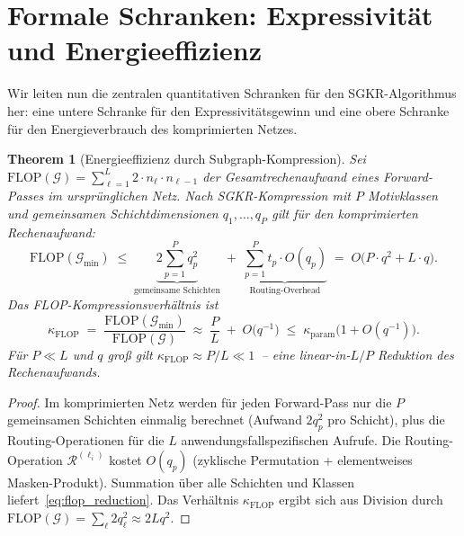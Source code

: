 ﻿\documentclass[12pt, a4paper, openany]{report}
\newtheorem{theorem}{Theorem}[chapter]
\newcommand{\calG}{\mathcal{G}}
\newcommand{\calR}{\mathcal{R}}
\begin{document}
\section{Formale Schranken: Expressivität und Energieeffizienz}
\label{sec:sgkr_bounds}

Wir leiten nun die zentralen quantitativen Schranken für den
SGKR-Algorithmus her: eine untere Schranke für den Expressivitätsgewinn
und eine obere Schranke für den Energieverbrauch des komprimierten Netzes.

\begin{theorem}[Energieeffizienz durch Subgraph-Kompression]
\label{thm:energy_efficiency}
Sei $\mathrm{FLOP}(\calG) = \sum_{\ell=1}^L 2 \cdot n_\ell \cdot n_{\ell-1}$
der Gesamtrechenaufwand eines Forward-Passes im ursprünglichen Netz.  Nach
SGKR-Kompression mit $P$ Motivklassen und gemeinsamen Schichtdimensionen
$q_1, \ldots, q_P$ gilt für den komprimierten Rechenaufwand:
\begin{equation}
  \label{eq:flop_reduction}
  \mathrm{FLOP}(\calG_{\min})
  \;\leq\;
  \underbrace{
    2\sum_{p=1}^{P} q_p^2
  }_{\text{gemeinsame Schichten}}
  \;+\;
  \underbrace{
    \sum_{p=1}^{P} t_p \cdot O(q_p)
  }_{\text{Routing-Overhead}}
  \;=\;
  O\!\bigl(P \cdot q^2 + L \cdot q\bigr).
\end{equation}
Das \emph{FLOP-Kompressionsverhältnis} ist
\begin{equation}
  \label{eq:flop_ratio}
  \kappa_{\mathrm{FLOP}}
  \;=\;
  \frac{\mathrm{FLOP}(\calG_{\min})}{\mathrm{FLOP}(\calG)}
  \;\approx\;
  \frac{P}{L} \;+\; O\!\bigl(q^{-1}\bigr)
  \;\leq\; \kappa_{\mathrm{param}}\bigl(1 + O(q^{-1})\bigr).
\end{equation}
Für $P \ll L$ und $q$ groß gilt $\kappa_{\mathrm{FLOP}} \approx P/L \ll 1$~--
eine linear-in-$L/P$ Reduktion des Rechenaufwands.
\end{theorem}

\begin{proof}
Im komprimierten Netz werden für jeden Forward-Pass nur die $P$ gemeinsamen
Schichten einmalig berechnet (Aufwand $2q_p^2$ pro Schicht), plus die
Routing-Operationen für die $L$ anwendungsfallspezifischen Aufrufe.
Die Routing-Operation $\calR^{(\ell_i)}$ kostet $O(q_p)$ (zyklische
Permutation + elementweises Masken-Produkt).  Summation über alle
Schichten und Klassen liefert~\eqref{eq:flop_reduction}.  Das Verhältnis
$\kappa_{\mathrm{FLOP}}$ ergibt sich aus Division durch
$\mathrm{FLOP}(\calG) = \sum_\ell 2 q_\ell^2 \approx 2Lq^2$.
\end{proof}
\end{document}

